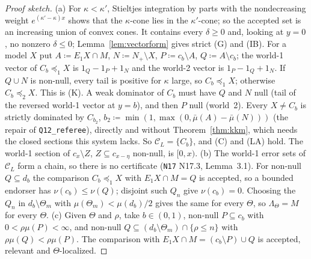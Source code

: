 \documentclass[11pt]{article}
\theoremstyle{definition}
\theoremstyle{remark}
\newcommand{\C}{\mathcal C}
\newcommand{\src}[1]{\texttt{#1}}
\begin{document}
\begin{proof}[Proof sketch]
(a) For $\kappa<\kappa'$, Stieltjes integration by parts with the nondecreasing weight $e^{(\kappa'-\kappa)x}$ shows that the $\kappa$-cone lies in the $\kappa'$-cone; so the accepted set is an increasing union of convex cones. It contains every $\delta\ge0$ and, looking at $y=0$, no nonzero $\delta\le0$; Lemma~\ref{lem:vectorform} gives strict (G) and (IB). For a model $X$ put $A\coloneqq E_1X\cap M$, $N\coloneqq N_+\setminus X$, $P\coloneqq c_b\setminus A$, $Q\coloneqq A\setminus c_b$; the world-1 vector of $C_b\preceq_1X$ is $1_Q-1_P+1_N$ and the world-2 vector is $1_P-1_Q+1_N$. If $Q\cup N$ is non-null, every tail is positive for $\kappa$ large, so $C_b\preceq_1X$; otherwise $C_b\preceq_2X$. This is (K). A weak dominator of $C_b$ must have $Q$ and $N$ null (tail of the reversed world-1 vector at $y=b$), and then $P$ null (world~2). Every $X\ne C_b$ is strictly dominated by $C_{b_2}$, $b_2\coloneqq\min(1,\max(0,\bar\mu(A)-\bar\mu(N)))$ (the repair of \src{Q12\_referee}), directly and without Theorem~\ref{thm:kkm}, which needs the closed sections this system lacks. So $\C_L=\{C_b\}$, and (C) and (LA) hold. The world-1 section of $c_x\setminus Z$, $Z\subseteq c_{x-\eta}$ non-null, is $[0,x)$. (b) The world-1 error sets of $\C_L$ form a chain, so there is no certificate (\src{N17} N17.3, Lemma~3.1). For non-null $Q\subseteq d_b$ the comparison $C_b\preceq_1X$ with $E_1X\cap M=Q$ is accepted, so a bounded endorser has $\nu(c_b)\le\nu(Q)$; disjoint such $Q_n$ give $\nu(c_b)=0$. Choosing the $Q_n$ in $d_b\setminus\Theta_m$ with $\mu(\Theta_m)<\mu(d_b)/2$ gives the same for every $\Theta$, so $\Lambda_\Theta=M$ for every $\Theta$. (c) Given $\Theta$ and $\rho$, take $b\in(0,1)$, non-null $P\subseteq c_b$ with $0<\rho\mu(P)<\infty$, and non-null $Q\subseteq(d_b\setminus\Theta_m)\cap\{\rho\le n\}$ with $\rho\mu(Q)<\rho\mu(P)$. The comparison with $E_1X\cap M=(c_b\setminus P)\cup Q$ is accepted, relevant and $\Theta$-localized.
\end{proof}
\end{document}
